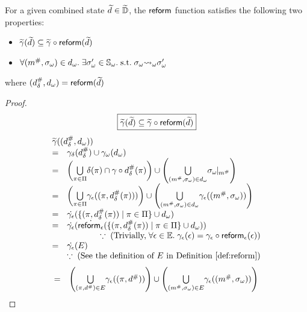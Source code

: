 \begin{lemma}\label{lemma:reform}
  For a given combined state $\widetilde{d} \in \widetilde{\mathbb{D}}$, the $\textsf{reform}$ function
  satisfies the following two properties:
  \begin{itemize}
    \item $\widetilde{\gamma}(\widetilde{d}) \subseteq \widetilde{\gamma} \circ \textsf{reform}(\widetilde{d})$
    \item $\forall ({m}^{\#}, {\sigma}_\omega) \in {{d}_\omega}. \; \exists {\sigma}_\omega' \in
      {\mathbb{S}}_\omega.  \; \text{s.t.} \; {\sigma}_\omega {\leadsto}_\omega {\sigma}_\omega'$
  \end{itemize}
  where $({{d}^{\#}_\delta}, {{d}_\omega}) = \textsf{reform}(\widetilde{d})$
\end{lemma}
\begin{proof}
  \[
    \fbox{$\widetilde{\gamma}(\widetilde{d}) \subseteq \widetilde{\gamma} \circ \textsf{reform}(\widetilde{d})$}
  \]
  \[
    \begin{array}{cl}
      \multicolumn{2}{l}{\combgamma((\sabselem, \symbelem))}\\
      =& \sgamma(\sabselem) \cup \symbgamma(\symbelem)\\

      =& \left( \underset{\view \in \viewset}{\bigcup} {\viewmap(\view) \cap
      \gamma \circ \sabselem(\view)} \right) \cup \left( \underset{(\absimap,
      \symbst) \in \symbelem}{\bigcup} \instant{\symbst}{\absimap} \right) \\

      =& \left( \underset{\view \in \viewset}{\bigcup} \aelemgamma((\view,
      \sabselem(\view))) \right) \cup \left( \underset{(\absimap, \symbst) \in
      \symbelem}{\bigcup} \aelemgamma((\absimap, \symbst)) \right) \\

      =& \dot\aelemgamma(\{ (\view, \sabselem(\view)) \mid \view \in \viewset \}
      \cup \symbelem)\\

      =& \dot\aelemgamma(\dot{\areform}(\{ (\view, \sabselem(\view)) \mid \view
      \in \viewset \} \cup \symbelem))\\

       & \multicolumn{1}{r}{\because \; (\text{Trivially,} \; \forall \aelem \in
       \aelemset.  \; \aelemgamma(\aelem) = \aelemgamma \circ \areform(\aelem))}\\

      =& \dot\aelemgamma(E)\\
       & \multicolumn{1}{r}{\because \; (\text{See the definition of $E$ in
       Definition~\ref{def:reform}})}\\
    \end{array}
  \]
  \[
    \begin{array}{cl}
      =& \left( \underset{(\pi, {d}^{\#}) \in E}{\bigcup} \gamma_{\epsilon}((\pi,
      {d}^{\#})) \right) \cup \left( \underset{({m}^{\#}, {\sigma}_\omega) \in
      E}{\bigcup} \gamma_{\epsilon}(({m}^{\#}, {\sigma}_\omega)) \right)\\


\end{array}\]
\end{proof}
